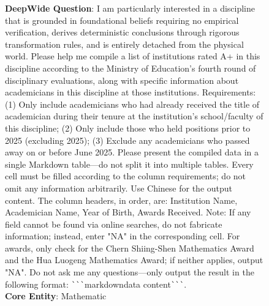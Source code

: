 \documentclass[11pt, letterpaper, logo, onecolumn, copyright, numbering]{paper_improved}
\begin{document}
\begin{figure}[htbp]
\begin{center}\end{center}\vspace{2mm}
    \begin{tcolorbox}[
        title=Input of Wide2Deep\_056 Instance,
        colback=yellow!10,
        colbacktitle=black!80,
        coltitle=white,
        arc=1mm,
        boxrule=0pt,
        breakable]
        \textbf{DeepWide Question}: I am particularly interested in a discipline that is grounded in foundational beliefs requiring no empirical verification, derives deterministic conclusions through rigorous transformation rules, and is entirely detached from the physical world. Please help me compile a list of institutions rated A+ in this discipline according to the Ministry of Education's fourth round of disciplinary evaluations, along with specific information about academicians in this discipline at those institutions. Requirements: (1) Only include academicians who had already received the title of academician during their tenure at the institution’s school/faculty of this discipline; (2) Only include those who held positions prior to 2025 (excluding 2025); (3) Exclude any academicians who passed away on or before June 2025. Please present the compiled data in a single Markdown table—do not split it into multiple tables. Every cell must be filled according to the column requirements; do not omit any information arbitrarily. Use Chinese for the output content. The column headers, in order, are: Institution Name, Academician Name, Year of Birth, Awards Received. Note: If any field cannot be found via online searches, do not fabricate information; instead, enter "NA" in the corresponding cell. For awards, only check for the Chern Shiing-Shen Mathematics Award and the Hua Luogeng Mathematics Award; if neither applies, output "NA". Do not ask me any questions—only output the result in the following format: \verb|```|markdown{data content}\verb|```|.\\
        \medskip
        \textbf{Core Entity}: Mathematic
    \end{tcolorbox}
    

\end{figure}
\end{document}
